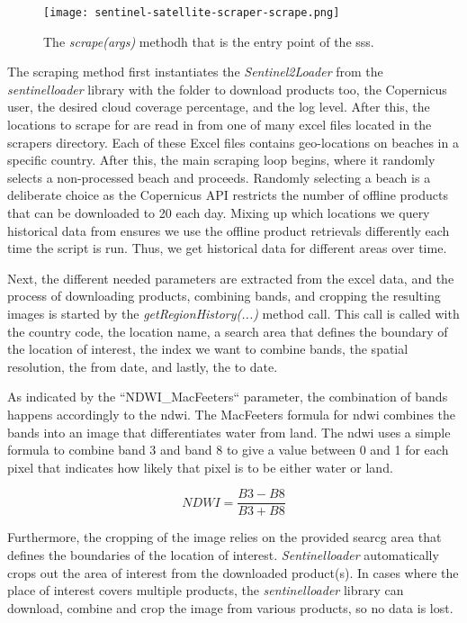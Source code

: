 \begin{figure}[h!]
    \centering
    \texttt{[image: sentinel-satellite-scraper-scrape.png]}
    \caption{The \emph{scrape(args)} methodh that is the entry point of the \acrshort{sss}.}
    \label{fig:sentinel-satellite-scraper-scrape}
\end{figure}

The scraping method first instantiates the \emph{Sentinel2Loader} from the \emph{sentinelloader} library with the folder to download products too, the Copernicus user, the desired cloud coverage percentage, and the log level. After this, the locations to scrape for are read in from one of many excel files located in the scrapers directory. Each of these Excel files contains geo-locations on beaches in a specific country. After this, the main scraping loop begins, where it randomly selects a non-processed beach and proceeds. Randomly selecting a beach is a deliberate choice as the Copernicus API restricts the number of offline products that can be downloaded to 20 each day. Mixing up which locations we query historical data from ensures we use the offline product retrievals differently each time the script is run. Thus, we get historical data for different areas over time.

Next, the different needed parameters are extracted from the excel data, and the process of downloading products, combining bands, and cropping the resulting images is started by the \emph{getRegionHistory(...)} method call. This call is called with the country code, the location name, a search area that defines the boundary of the location of interest, the index we want to combine bands, the spatial resolution, the from date, and lastly, the to date.

As indicated by the ``NDWI\_MacFeeters`` parameter, the combination of bands happens accordingly to the \acrfull{ndwi}. The MacFeeters formula for \acrshort{ndwi} combines the bands into an image that differentiates water from land. The \acrshort{ndwi} uses a simple formula to combine band 3 and band 8 to give a value between 0 and 1 for each pixel that indicates how likely that pixel is to be either water or land.

\[ NDWI = \dfrac{B3 - B8}{B3 + B8} \]

Furthermore, the cropping of the image relies on the provided searcg area that defines the boundaries of the location of interest. \emph{Sentinelloader} automatically crops out the area of interest from the downloaded product(s). In cases where the place of interest covers multiple products, the \emph{sentinelloader} library can download, combine and crop the image from various products, so no data is lost.

